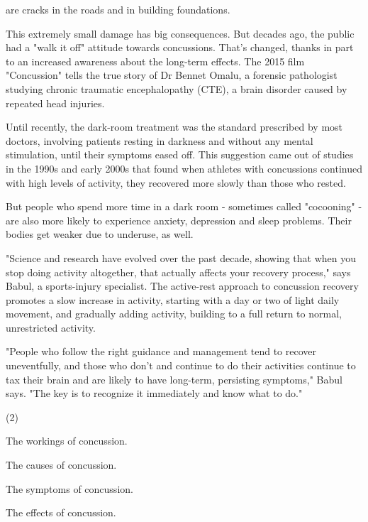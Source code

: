 \documentclass{英语试卷}
\begin{document}
\par are cracks in the roads and in building foundations.\par
\par This extremely small damage has big consequences. But decades ago, the public had a "walk it off" attitude towards concussions. That's changed, thanks in part to an increased awareness about the long-term effects. The 2015 film "Concussion" tells the true story of Dr Bennet Omalu, a forensic pathologist studying chronic traumatic encephalopathy (CTE), a brain disorder caused by repeated head injuries.\par
\par Until recently, the dark-room treatment was the standard prescribed by most doctors, involving patients resting in darkness and without any mental stimulation, until their symptoms eased off. This suggestion came out of studies in the 1990s and early 2000s that found when athletes with concussions continued with high levels of activity, they recovered more slowly than those who rested.\par
\par But people who spend more time in a dark room - sometimes called "cocooning" - are also more likely to experience anxiety, depression and sleep problems. Their bodies get weaker due to underuse, as well.\par
\par "Science and research have evolved over the past decade, showing that when you stop doing activity altogether, that actually affects your recovery process," says Babul, a sports-injury specialist. The active-rest approach to concussion recovery promotes a slow increase in activity, starting with a day or two of light daily movement, and gradually adding activity, building to a full return to normal, unrestricted activity.\par
\par "People who follow the right guidance and management tend to recover uneventfully, and those who don't and continue to do their activities continue to tax their brain and are likely to have long-term, persisting symptoms," Babul says. "The key is to recognize it immediately and know what to do."\par
{}
\begin{choices}(2)
  \item The workings of concussion.
  \item The causes of concussion.
  \item The symptoms of concussion.
  \item The effects of concussion.
\end{choices}
\end{document}
